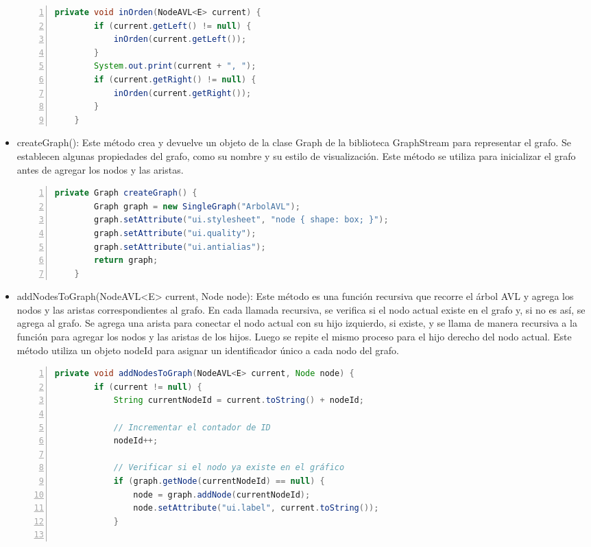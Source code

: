 \documentclass{article}
\begin{document}
\begin{itemize}
\begin{lstlisting}[language=Java, caption=Método inOrden(), numbers=left]
    private void inOrden(NodeAVL<E> current) {
        if (current.getLeft() != null) {
            inOrden(current.getLeft());
        }
        System.out.print(current + ", ");
        if (current.getRight() != null) {
            inOrden(current.getRight());
        }
    }
                            \end{lstlisting}
                    \item createGraph(): Este método crea y devuelve un objeto de la clase Graph de la biblioteca GraphStream para representar el grafo. Se establecen algunas propiedades del grafo, como su nombre y su estilo de visualización. Este método se utiliza para inicializar el grafo antes de agregar los nodos y las aristas.
                            \begin{lstlisting}[language=Java, caption=Método createGraph(), numbers=left]
    private Graph createGraph() {
        Graph graph = new SingleGraph("ArbolAVL");
        graph.setAttribute("ui.stylesheet", "node { shape: box; }");
        graph.setAttribute("ui.quality");
        graph.setAttribute("ui.antialias");
        return graph;
    }
                            \end{lstlisting}
                    \item addNodesToGraph(NodeAVL<E> current, Node node): Este método es una función recursiva que recorre el árbol AVL y agrega los nodos y las aristas correspondientes al grafo. En cada llamada recursiva, se verifica si el nodo actual existe en el grafo y, si no es así, se agrega al grafo. Se agrega una arista para conectar el nodo actual con su hijo izquierdo, si existe, y se llama de manera recursiva a la función para agregar los nodos y las aristas de los hijos. Luego se repite el mismo proceso para el hijo derecho del nodo actual. Este método utiliza un objeto nodeId para asignar un identificador único a cada nodo del grafo.
                            \begin{lstlisting}[language=Java, caption={Método addNodesToGraph(NodeAVL<E> current, Node node)}, numbers=left]
    private void addNodesToGraph(NodeAVL<E> current, Node node) {
        if (current != null) {
            String currentNodeId = current.toString() + nodeId;
    
            // Incrementar el contador de ID
            nodeId++;
    
            // Verificar si el nodo ya existe en el gráfico
            if (graph.getNode(currentNodeId) == null) {
                node = graph.addNode(currentNodeId);
                node.setAttribute("ui.label", current.toString());
            }
    

\end{lstlisting}
\end{itemize}
\end{document}
